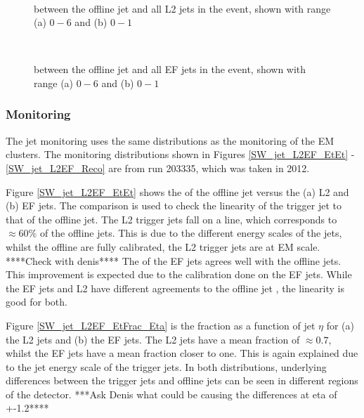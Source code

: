 \begin{figure}
\centering
\mbox{
              \quad
              \quad
                              }
\caption[\dr{} between offline and L2 jets]{\dr{} between the offline jet and all L2 jets in the event, shown with range (a) $0 - 6$ and (b) $0 - 1$ \label{SW_jet_L2_dR}}
\end{figure}

\begin{figure}
\centering
\mbox{
              \quad
              \quad
                              }
\caption[\dr{} between offline and EF jets]{\dr{} between the offline jet and all EF jets in the event, shown with range (a) $0 - 6$ and (b) $0 - 1$ \label{SW_jet_EF_dR}}
\end{figure}



\subsubsection{Monitoring}

The jet monitoring uses the same distributions as the monitoring of the EM clusters.
The monitoring distributions shown in Figures \ref{SW_jet_L2EF_EtEt} - \ref{SW_jet_L2EF_Reco} are from run 203335, which was taken in 2012.

Figure \ref{SW_jet_L2EF_EtEt} shows the \et{} of the offline jet versus the (a) L2 and (b) EF jets.
The \et{} comparison is used to check the linearity of the trigger jet \et{} to that of the offline jet.
The L2 trigger jets fall on a line, which corresponds to $\approx 60 \%$ of the offline jets. 
This is due to the different energy scales of the jets, whilst the offline are fully calibrated, the L2 trigger jets are at EM scale.
****Check with denis****
The \et{} of the EF jets agrees well with the offline jets. 
This improvement is expected due to the calibration done on the EF jets.
While the EF jets and L2 have different agreements to the offline jet \et{}, the linearity is good for both.

Figure \ref{SW_jet_L2EF_EtFrac_Eta} is the \et{} fraction as a function of jet $\eta$ for (a) the L2 jets and (b) the EF jets.
The L2 jets have a mean \et{} fraction of $\approx 0.7$, whilst the EF jets have a mean \et{} fraction closer to one.  
This is again explained due to the jet energy scale of the trigger jets.
In both distributions, underlying differences between the trigger jets and offline jets can be seen in different regions of the detector.
***Ask Denis what could be causing the differences at eta of +-1.2****

